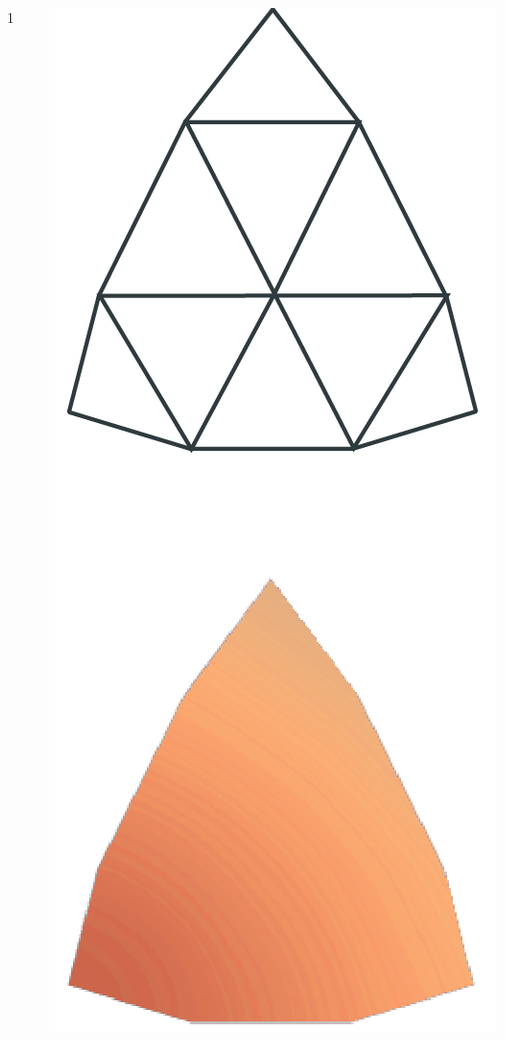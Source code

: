 \begin{frame}
\begin{columns}
\begin{column}[b]{0.22\textwidth}
\begin{center}
					\small{1}
				\end{center}	
			\end{column}
			\begin{column}[b]{0.22\textwidth}
				\begin{center}
					\includegraphics[width=\textwidth]{./img/1_single/lod_lod2.png}	

\end{center}
\end{column}
\end{columns}
\end{frame}
